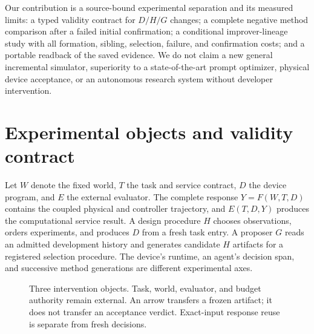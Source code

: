 Our contribution is a source-bound experimental separation and its measured
limits: a typed validity contract for $D/H/G$ changes; a complete negative method
comparison after a failed initial confirmation; a conditional improver-lineage
study with all formation, sibling, selection, failure, and confirmation costs;
and a portable readback of the saved evidence. We do not claim a new general
incremental simulator, superiority to a state-of-the-art prompt optimizer,
physical device acceptance, or an autonomous research system without developer
intervention.

\section{Experimental objects and validity contract}
Let $W$ denote the fixed world, $T$ the task and service contract, $D$ the device
program, and $E$ the external evaluator. The complete response
$Y=F(W,T,D)$ contains the coupled physical and controller trajectory, and
$E(T,D,Y)$ produces the computational service result. A design procedure $H$
chooses observations, orders experiments, and produces $D$ from a fresh task
entry. A proposer $G$ reads an admitted development history and generates
candidate $H$ artifacts for a registered selection procedure. The device's
runtime, an agent's decision span, and successive method generations are
different experimental axes.

\begin{figure}[htbp]
\centering
{}
\caption{Three intervention objects. Task, world, evaluator, and budget authority
remain external. An arrow transfers a frozen artifact; it does not transfer an
acceptance verdict. Exact-input response reuse is separate from fresh decisions.}
\label{fig:objects}
\end{figure}

